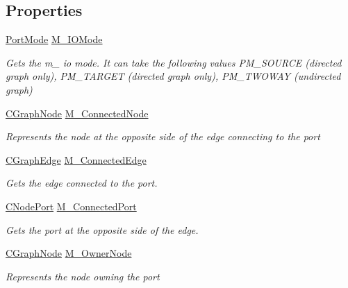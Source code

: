 \subsection*{Properties}
\begin{DoxyCompactItemize}
\item 
\hyperlink{namespace_graph_library_a31c4a22c3817f16aa24bafc1c822c3a4}{Port\+Mode} \hyperlink{class_graph_library_1_1_c_node_port_a2cb7f035efed2fe8374be94bd354529a}{M\+\_\+\+I\+O\+Mode}
\begin{DoxyCompactList}\small\item\em Gets the m\+\_\+ io mode. It can take the following values P\+M\+\_\+\+S\+O\+U\+R\+C\+E (directed graph only), P\+M\+\_\+\+T\+A\+R\+G\+E\+T (directed graph only), P\+M\+\_\+\+T\+W\+O\+W\+A\+Y (undirected graph) \end{DoxyCompactList}\item 
\hyperlink{class_graph_library_1_1_c_graph_node}{C\+Graph\+Node} \hyperlink{class_graph_library_1_1_c_node_port_a00cabaca834e49fe3c5d057e8122bea9}{M\+\_\+\+Connected\+Node}
\begin{DoxyCompactList}\small\item\em Represents the node at the opposite side of the edge connecting to the port \end{DoxyCompactList}\item 
\hyperlink{class_graph_library_1_1_c_graph_edge}{C\+Graph\+Edge} \hyperlink{class_graph_library_1_1_c_node_port_a779a49381130c23c2dce8ccb0185eebe}{M\+\_\+\+Connected\+Edge}
\begin{DoxyCompactList}\small\item\em Gets the edge connected to the port. \end{DoxyCompactList}\item 
\hyperlink{class_graph_library_1_1_c_node_port}{C\+Node\+Port} \hyperlink{class_graph_library_1_1_c_node_port_a2ed73460c9543943fe37b19c57813a4a}{M\+\_\+\+Connected\+Port}
\begin{DoxyCompactList}\small\item\em Gets the port at the opposite side of the edge. \end{DoxyCompactList}\item 
\hyperlink{class_graph_library_1_1_c_graph_node}{C\+Graph\+Node} \hyperlink{class_graph_library_1_1_c_node_port_ade5210cf6e28999f415591d5d4a02cdf}{M\+\_\+\+Owner\+Node}
\begin{DoxyCompactList}\small\item\em Represents the node owning the port \end{DoxyCompactList}\end{DoxyCompactItemize}


